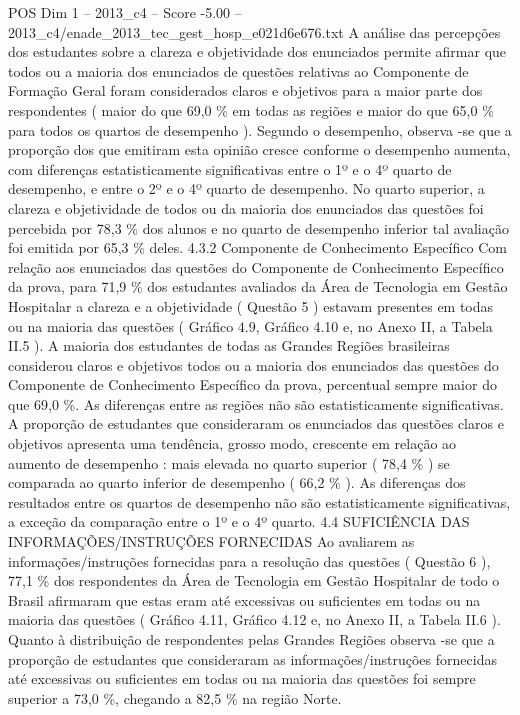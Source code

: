 \begin{textsample}{POS Dim 1 – 2013\_c4 – Score -5.00 – 2013\_c4/enade\_2013\_tec\_gest\_hosp\_e021d6e676.txt}
A análise das percepções dos estudantes sobre a clareza e objetividade dos enunciados permite afirmar que todos ou a maioria dos enunciados de questões relativas ao Componente de Formação Geral foram considerados claros e objetivos para a maior parte dos respondentes ( maior do que 69,0 \% em todas as regiões e maior do que 65,0 \% para todos os quartos de desempenho ).
Segundo o desempenho, observa -se que a proporção dos que emitiram esta opinião cresce conforme o desempenho aumenta, com diferenças estatisticamente significativas entre o 1º e o 4º quarto de desempenho, e entre o 2º e o 4º quarto de desempenho.
No quarto superior, a clareza e objetividade de todos ou da maioria dos enunciados das questões foi percebida por 78,3 \% dos alunos e no quarto de desempenho inferior tal avaliação foi emitida por 65,3 \% deles. 4.3.2 Componente de Conhecimento Específico Com relação aos enunciados das questões do Componente de Conhecimento Específico da prova, para 71,9 \% dos estudantes avaliados da Área de Tecnologia em Gestão Hospitalar a clareza e a objetividade ( Questão 5 ) estavam presentes em todas ou na maioria das questões ( Gráfico 4.9, Gráfico 4.10 e, no Anexo II, a Tabela II.5 ).
A maioria dos estudantes de todas as Grandes Regiões brasileiras considerou claros e objetivos todos ou a maioria dos enunciados das questões do Componente de Conhecimento Específico da prova, percentual sempre maior do que 69,0 \%.
As diferenças entre as regiões não são estatisticamente significativas.
A proporção de estudantes que consideraram os enunciados das questões claros e objetivos apresenta uma tendência, grosso modo, crescente em relação ao aumento de desempenho : mais elevada no quarto superior ( 78,4 \% ) se comparada ao quarto inferior de desempenho ( 66,2 \% ).
As diferenças dos resultados entre os quartos de desempenho não são estatisticamente significativas, a exceção da comparação entre o 1º e o 4º quarto. 4.4 SUFICIÊNCIA DAS INFORMAÇÕES/INSTRUÇÕES FORNECIDAS Ao avaliarem as informações/instruções fornecidas para a resolução das questões ( Questão 6 ), 77,1 \% dos respondentes da Área de Tecnologia em Gestão Hospitalar de todo o Brasil afirmaram que estas eram até excessivas ou suficientes em todas ou na maioria das questões ( Gráfico 4.11, Gráfico 4.12 e, no Anexo II, a Tabela II.6 ).
Quanto à distribuição de respondentes pelas Grandes Regiões observa -se que a proporção de estudantes que consideraram as informações/instruções fornecidas até excessivas ou suficientes em todas ou na maioria das questões foi sempre superior a 73,0 \%, chegando a 82,5 \% na região Norte.

\end{textsample}
